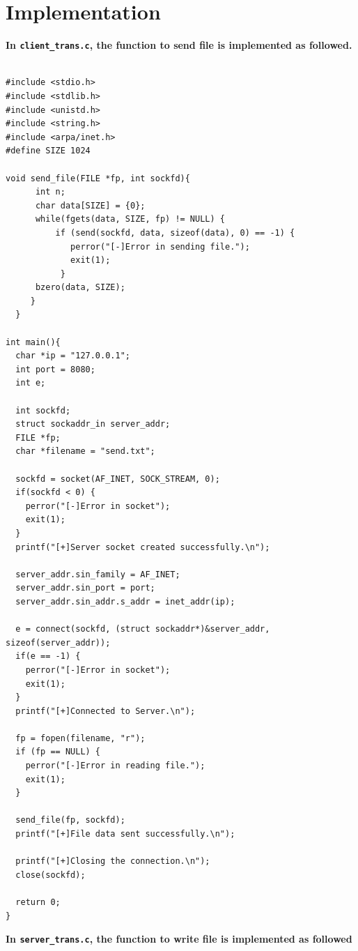 \documentclass[11pt, a4paper]{article}
\begin{document}
\section{Implementation}
\hspace{0.5cm}
\textbf{ In \texttt{client_trans.c}, the function to send file is implemented as followed.}
\hspace{1cm}
\begin{verbatim}

#include <stdio.h>
#include <stdlib.h>
#include <unistd.h>
#include <string.h>
#include <arpa/inet.h>
#define SIZE 1024

void send_file(FILE *fp, int sockfd){
      int n;
      char data[SIZE] = {0};
      while(fgets(data, SIZE, fp) != NULL) {
          if (send(sockfd, data, sizeof(data), 0) == -1) {
             perror("[-]Error in sending file.");
             exit(1);
           }
      bzero(data, SIZE);
     }
  }
 
int main(){
  char *ip = "127.0.0.1";
  int port = 8080;
  int e;
 
  int sockfd;
  struct sockaddr_in server_addr;
  FILE *fp;
  char *filename = "send.txt";
 
  sockfd = socket(AF_INET, SOCK_STREAM, 0);
  if(sockfd < 0) {
    perror("[-]Error in socket");
    exit(1);
  }
  printf("[+]Server socket created successfully.\n");
 
  server_addr.sin_family = AF_INET;
  server_addr.sin_port = port;
  server_addr.sin_addr.s_addr = inet_addr(ip);
 
  e = connect(sockfd, (struct sockaddr*)&server_addr, sizeof(server_addr));
  if(e == -1) {
    perror("[-]Error in socket");
    exit(1);
  }
  printf("[+]Connected to Server.\n");
 
  fp = fopen(filename, "r");
  if (fp == NULL) {
    perror("[-]Error in reading file.");
    exit(1);
  }
 
  send_file(fp, sockfd);
  printf("[+]File data sent successfully.\n");
 
  printf("[+]Closing the connection.\n");
  close(sockfd);
 
  return 0;
}                        
\end{verbatim}
\vspace{0.5cm}
\hspace{0.5cm}
 \textbf{In \texttt{server_trans.c}, the function to write file is implemented as followed}
 \hspace{1cm}
\end{document}
